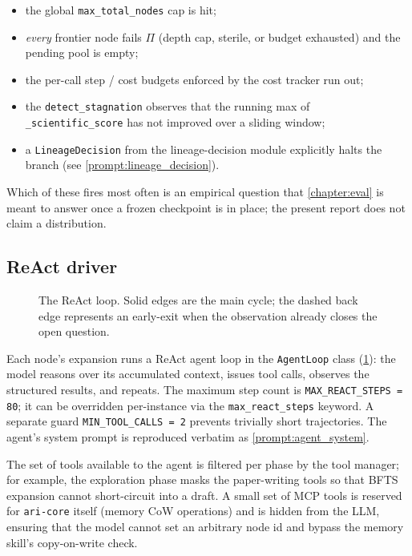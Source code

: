 \begin{itemize}
  \item the global \texttt{max\_total\_nodes} cap is hit;
  \item \emph{every} frontier node fails $\Pi$ (depth cap, sterile,
        or budget exhausted) and the pending pool is empty;
  \item the per-call step / cost budgets enforced by the cost
        tracker run out;
  \item the  \texttt{detect\_stagnation}
        observes that the running max of \texttt{\_scientific\_score}
        has not improved over a sliding window;
  \item a \texttt{LineageDecision} from the lineage-decision module
        explicitly halts the branch (see \cref{prompt:lineage_decision}).
\end{itemize}

Which of these fires most often is an empirical question that
\cref{chapter:eval} is meant to answer once a frozen checkpoint
is in place; the present report does not claim a distribution.

\subsection{ReAct driver}\label{sec:exploration:react}

\begin{figure}[t]
  \centering
  \resizebox{\columnwidth}{!}{}
  \caption{The ReAct loop. Solid edges are the main cycle; the
           dashed back edge represents an early-exit when the
           observation already closes the open question.}
  \label{fig:react}
\end{figure}

Each node's expansion runs a ReAct agent loop \cite{yao2023react} in
the \texttt{AgentLoop} class
(\cref{fig:react}): the model reasons over its accumulated context,
issues tool calls, observes the structured results, and repeats. The
maximum step count is \texttt{MAX\_REACT\_STEPS = 80}; it can be
overridden per-instance via the \texttt{max\_react\_steps} keyword. A
separate guard \texttt{MIN\_TOOL\_CALLS = 2} prevents trivially short
trajectories. The agent's system prompt is reproduced verbatim as
\cref{prompt:agent_system}.

The set of tools available to the agent is filtered per phase by
the tool manager; for example, the exploration phase masks the
paper-writing tools so that BFTS expansion cannot short-circuit
into a draft. A small set of MCP tools is reserved for
\texttt{ari-core} itself (memory CoW operations) and is hidden
from the LLM, ensuring that the model cannot set an arbitrary node
id and bypass the memory skill's copy-on-write check.

